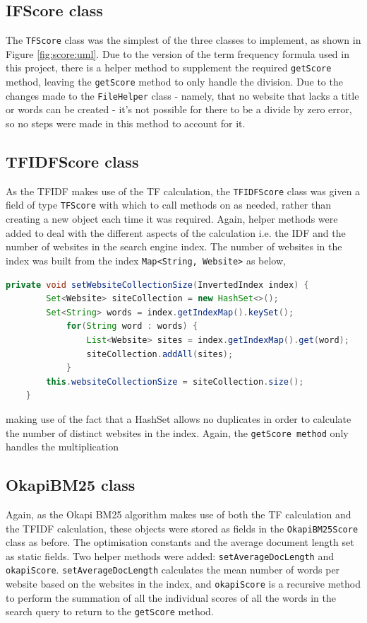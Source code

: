 \subsection{IFScore class}
The {\tt TFScore} class was the simplest of the three classes to implement, as shown in Figure \ref{fig:score:uml}.
Due to the version of the term frequency formula used in this project, there is a helper method to supplement the required {\tt getScore} method, leaving the {\tt getScore} method to only handle the division.
Due to the changes made to the {\tt FileHelper} class - namely, that no website that lacks a title or words can be created - it's not possible
for there to be a divide by zero error, so no steps were made in this method to account for it.

\subsection{TFIDFScore class}
As the TFIDF makes use of the TF calculation, the {\tt TFIDFScore} class was given a field of type {\tt TFScore} with which to call methods on as needed, rather than creating a new object each time it was required.
Again, helper methods were added to deal with the different aspects of the calculation i.e. the IDF and the number of websites in the search engine index.
The number of websites in the index was built from the index {\tt Map<String, Website>} as below,

\begin{lstlisting}[language=Java]
    private void setWebsiteCollectionSize(InvertedIndex index) {
        Set<Website> siteCollection = new HashSet<>();
        Set<String> words = index.getIndexMap().keySet();
            for(String word : words) {
                List<Website> sites = index.getIndexMap().get(word);
                siteCollection.addAll(sites);
            }
        this.websiteCollectionSize = siteCollection.size();
    }
\end{lstlisting}

making use of the fact that a HashSet allows no duplicates in order to calculate the number of distinct websites in the index.
Again, the {\tt getScore method} only handles the multiplication

\subsection{OkapiBM25 class}
Again, as the Okapi BM25 algorithm makes use of both the TF calculation and the TFIDF calculation, these objects were stored as fields in the {\tt OkapiBM25Score} class as before.
The optimisation constants and the average document length set as static fields.
Two helper methods were added: {\tt setAverageDocLength} and {\tt okapiScore}. {\tt setAverageDocLength} calculates the mean number of words per website based on the websites in the index, and {\tt okapiScore} is a recursive method to perform the summation of all the individual scores of all the words in the search query to return to the {\tt getScore} method.

